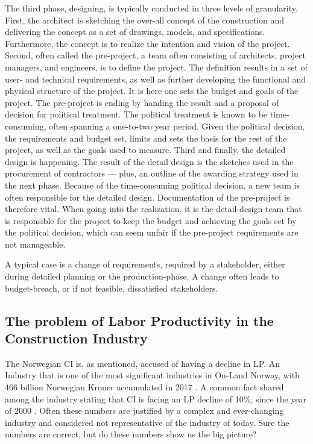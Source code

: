The third phase, designing, is typically conducted in three levels of granularity. First, the architect is sketching the over-all concept of the construction and delivering the concept as a set of drawings, models, and specifications. Furthermore, the concept is to realize the intention and vision of the project. Second, often called the pre-project, a team often consisting of architects, project managers, and engineers, is to define the project. The definition results in a set of user- and technical requirements, as well as further developing the functional and physical structure of the project. It is here one sets the budget and goals of the project. The pre-project is ending by handing the result and a proposal of decision for political treatment. The political treatment is known to be time-consuming, often spanning a one-to-two year period. Given the political decision, the requirements and budget set, limits and sets the basis for the rest of the project, as well as the goals used to measure. Third and finally, the detailed design is happening. The result of the detail design is the sketches used in the procurement of contractors — plus, an outline of the awarding strategy used in the next phase. Because of the time-consuming political decision, a new team is often responsible for the detailed design. Documentation of the pre-project is therefore vital. When going into the realization, it is the detail-design-team that is responsible for the project to keep the budget and achieving the goals set by the political decision, which can seem unfair if the pre-project requirements are not manageable.

A typical case is a change of requirements, required by a stakeholder, either during detailed planning or the production-phase. A change often leads to budget-breach, or if not feasible, dissatisfied stakeholders. 

\subsection{The problem of Labor Productivity in the Construction Industry}
The Norwegian CI is, as mentioned, accused of having a decline in LP. An Industry that is one of the most significant industries in On-Land Norway, with 466 billion Norwegian Kroner accumulated in 2017 \cite{vekst2018}. A common fact shared among the industry stating that CI is facing an LP decline of 10\%, since the year of 2000 \cite{ssb_productivity}. Often these numbers are justified by a complex and ever-changing industry and considered not representative of the industry of today. Sure the numbers are correct, but do these numbers show us the big picture?

